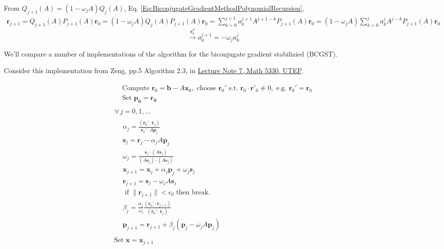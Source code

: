 \documentclass[10pt]{amsart}
\begin{document}
\begin{multicols*}{2}
From $Q_{j+1}(A) = (1- \omega_j A) Q_j(A)$, Eq. \ref{Eq:BiconjugateGradientMethodPolynomialRecursion}, 
\[
\begin{gathered}
	\mathbf{r}_{j+1} = Q_{j+1}(A) P_{j+1}(A)\mathbf{r}_0 = (1- \omega_j A) Q_j(A) P_{j+1}(A) \mathbf{r}_0 = \sum_{k=0}^{j + 1} a^{j+1}_k A^{j + 1-k} P_{j+1}(A) \mathbf{r}_0 = (1 - \omega_j A) \sum_{k=0}^j a_k^j A^{j-k} P_{j+1}(A) \mathbf{r}_0 
\end{gathered}
\]
\begin{equation}
	\xrightarrow{ \mathbf{r}_0^T } a_0^{j+1} = -\omega_j a_0^j
\end{equation}

We'll compare a number of implementations of the algorithm for the biconjugate gradient stabilizied (BCGST).

Consider this implementation from Zeng, pp.5 Algorithm 2.3, in \href{https://utminers.utep.edu/xzeng/2017spring_math5330/MATH_5330_Computational_Methods_of_Linear_Algebra_files/ln07.pdf}{Lecture Note 7, Math 5330, UTEP}.

\begin{equation}
\begin{gathered}
	\begin{aligned}
	& \text{ Compute } \mathbf{r}_0 = \mathbf{b} - A \mathbf{x}_0, \text{ choose } \mathbf{r}_0' \text{ s.t. } \mathbf{r}_0 \cdot \mathbf{r}'_0 \neq 0, \text{ e.g. } \mathbf{r}_0' = \mathbf{r}_0 \\
	& \text{ Set } \mathbf{p_0} = \mathbf{r_0}
\end{aligned} \\
\begin{gathered}
	\forall \, j = 0, 1, \dots \\
	\begin{aligned}
		& \alpha_j = \frac{ (\mathbf{r}_0' \cdot \mathbf{r}_j) }{ \mathbf{r}_0' \cdot A \mathbf{p}_j } \\
		& \mathbf{s}_j = \mathbf{r}_j - \alpha_j A \mathbf{p}_j \\
		& \omega_j = \frac{ \mathbf{s}_j \cdot (A \mathbf{s}_j) }{ (A\mathbf{s}_j)\cdot (A\mathbf{s}_j) } \\
		& \mathbf{x}_{j+1} = \mathbf{x}_j + \alpha_j \mathbf{p}_j + \omega_j \mathbf{s}_j \\
		& \mathbf{r}_{j+1} = \mathbf{s}_j - \omega_j A\mathbf{s}_j \\
		& \text{ if } \| \mathbf{r}_{j+1} \| < \epsilon_0 \text{ then break. } \\
		& \beta_j = \frac{ \alpha_j }{ \omega_j } \frac{ (\mathbf{r}_0' \cdot \mathbf{r}_{j+1} ) }{ (\mathbf{r}_0' \cdot \mathbf{r}_j )} \\
		& \mathbf{p}_{j+1} = \mathbf{r}_{j+1} + \beta_j (\mathbf{p}_j - \omega_j A \mathbf{p}_j)
	\end{aligned} 
\end{gathered}	\\
\text{ Set } \mathbf{x} = \mathbf{x}_{j+1}
\end{gathered}
\end{equation}


\end{multicols*}
\end{document}
